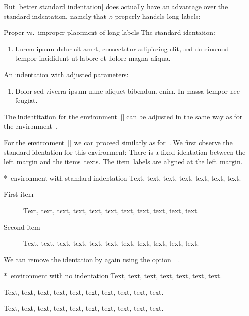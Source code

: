 But \cref{better standard indentation} does actually have an advantage over the standard indentation, namely that it properly handels long labels:
\begin{showlatex}{Proper vs.\ improper placement of long labels}
The standard identation:
\begin{enumerate}[label = {(Latin \arabic*)}]
  \item
  Lorem ipsum dolor sit amet, consectetur adipiscing elit, sed do eiusmod tempor incididunt ut labore et dolore magna aliqua.
\end{enumerate}
An indentation with adjusted parameters:
\begin{enumerate}[label = {(Latin \arabic*)}, wide = 0pt, leftmargin = *, labelindent = \parindent]
  \item
  Dolor sed viverra ipsum nunc aliquet bibendum enim.
  In massa tempor nec feugiat.
\end{enumerate}
\end{showlatex}

The indentitation for the environment~[\envname] can be adjusted in the same way as for the environment~.

For the environment~[\envname] we can proceed similarly as for~.
We first observe the standard identation for this environment:
There is a fixed identation between the left~margin and the items~texts.
The item~labels are aligned at the left~margin.
\begin{showlatex}*{~environment with standard indentation}
Text, text, text, text, text, text, text.
\begin{description}
  \item[First item]
    Text, text, text, text, text, text, text, text, text, text, text.
  \item[Second item]
     Text, text, text, text, text, text, text, text, text, text, text.
\end{description}
\end{showlatex}
We can remove the identation by again using the option~[\optname].
\begin{showlatex}*{~environment with no indentation}
Text, text, text, text, text, text, text.
\begin{description}[wide = 0pt]
  \item[First item]
    Text, text, text, text, text, text, text, text, text, text.
  \item[Second item]
     Text, text, text, text, text, text, text, text, text, text.
\end{description}
\end{showlatex}

